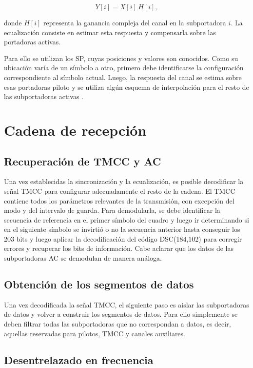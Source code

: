 \begin{equation}
Y[i] = X[i]\,H[i],
\end{equation}

donde $H[i]$ representa la ganancia compleja del canal en la subportadora $i$. La ecualización consiste en estimar esta respuesta y compensarla sobre las portadoras activas.

Para ello se utilizan los SP, cuyas posiciones y valores son conocidos. Como su ubicación varía de un símbolo a otro, primero debe identificarse la configuración correspondiente al símbolo actual. Luego, la respuesta del canal se estima sobre esas portadoras piloto y se utiliza algún esquema de interpolación para el resto de las subportadoras activas \cite{uruguay_rx}.
\section{Cadena de recepción}
\subsection{Recuperación de TMCC y AC}

Una vez establecidas la sincronización y la ecualización, es posible decodificar la señal TMCC para configurar adecuadamente el resto de la cadena. El TMCC contiene todos los parámetros relevantes de la transmisión, con excepción del modo y del intervalo de guarda. Para demodularla, se debe identificar la secuencia de referencia en el primer símbolo del cuadro y luego ir determinando si en el siguiente símbolo se invirtió o no la secuencia anterior hasta conseguir los 203 bits y luego aplicar la decodificación del código DSC(184,102) para corregir errores y recuperar los bits de información. Cabe aclarar que los datos de las subportadoras AC se demodulan de manera análoga.

\subsection{Obtención de los segmentos de datos}

Una vez decodificada la señal TMCC, el siguiente paso es aislar las subportadoras de datos y volver a construir los segmentos de datos. Para ello simplemente se deben filtrar todas las subportadoras que no correspondan a datos, es decir, aquellas reservadas para pilotos, TMCC y canales auxiliares.


\subsection{Desentrelazado en frecuencia}

